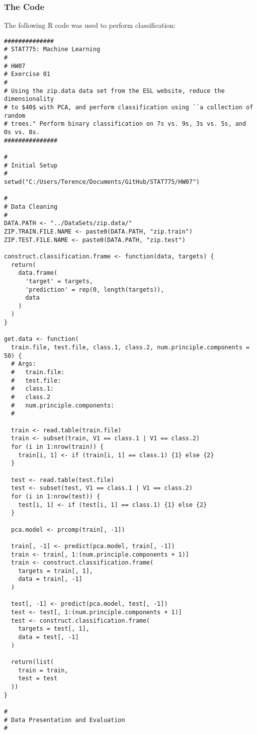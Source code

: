 \documentclass{article}
\begin{document}
\subsubsection{The Code}
The following R code was used to perform classification:
\begin{verbatim}
##############
# STAT775: Machine Learning
#
# HW07
# Exercise 01
#
# Using the zip.data data set from the ESL website, reduce the dimensionality
# to $40$ with PCA, and perform classification using ``a collection of random
# trees." Perform binary classification on 7s vs. 9s, 3s vs. 5s, and 0s vs. 8s.
###############

#
# Initial Setup
#
setwd("C:/Users/Terence/Documents/GitHub/STAT775/HW07")

#
# Data Cleaning
#
DATA.PATH <- "../DataSets/zip.data/"
ZIP.TRAIN.FILE.NAME <- paste0(DATA.PATH, "zip.train")
ZIP.TEST.FILE.NAME <- paste0(DATA.PATH, "zip.test")

construct.classification.frame <- function(data, targets) {
  return(
    data.frame(
      'target' = targets,
      'prediction' = rep(0, length(targets)),
      data
    )
  )
}

get.data <- function(
  train.file, test.file, class.1, class.2, num.principle.components = 50) {
  # Args:
  #   train.file:
  #   test.file:
  #   class.1:
  #   class.2
  #   num.principle.components:
  #

  train <- read.table(train.file)
  train <- subset(train, V1 == class.1 | V1 == class.2)
  for (i in 1:nrow(train)) {
    train[i, 1] <- if (train[i, 1] == class.1) {1} else {2}
  }

  test <- read.table(test.file)
  test <- subset(test, V1 == class.1 | V1 == class.2)
  for (i in 1:nrow(test)) {
    test[i, 1] <- if (test[i, 1] == class.1) {1} else {2}
  }

  pca.model <- prcomp(train[, -1])

  train[, -1] <- predict(pca.model, train[, -1])
  train <- train[, 1:(num.principle.components + 1)]
  train <- construct.classification.frame(
    targets = train[, 1],
    data = train[, -1]
  )

  test[, -1] <- predict(pca.model, test[, -1])
  test <- test[, 1:(num.principle.components + 1)]
  test <- construct.classification.frame(
    targets = test[, 1],
    data = test[, -1]
  )

  return(list(
    train = train,
    test = test
  ))
}

#
# Data Presentation and Evaluation
#


\end{verbatim}
\end{document}
